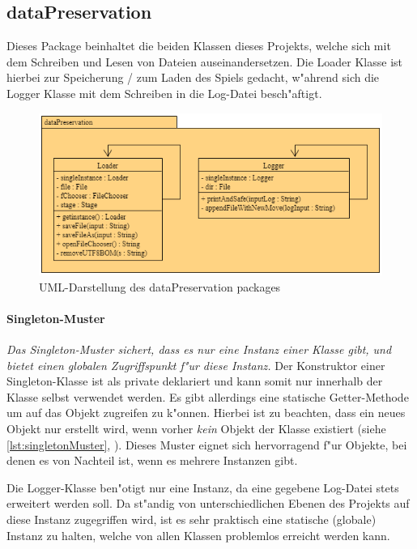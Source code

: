 \subsection{dataPreservation}
\label{ss:dataPreservation}
Dieses Package beinhaltet die beiden Klassen dieses Projekts, welche sich mit dem Schreiben und Lesen von Dateien auseinandersetzen. Die Loader Klasse ist hierbei zur Speicherung / zum Laden des Spiels gedacht, w"ahrend sich die Logger Klasse mit dem Schreiben in die Log-Datei besch"aftigt. 

\begin{figure}
	\centering
	\includegraphics{pics/dataPreservationPackage}
	\caption{UML-Darstellung des dataPreservation packages}
	\label{fig:dataPreservationPackage}
\end{figure}

\paragraph{Singleton-Muster}
\label{par:singletonMuster}
\emph{Das Singleton-Muster sichert, dass es nur eine Instanz einer Klasse gibt, und bietet einen globalen Zugriffspunkt f"ur diese Instanz.} \cite{Freeman2006}
Der Konstruktor einer Singleton-Klasse ist als private deklariert und kann somit nur innerhalb der Klasse selbst verwendet werden. Es gibt allerdings eine statische Getter-Methode um auf das Objekt zugreifen zu k"onnen. Hierbei ist zu beachten, dass ein neues Objekt nur erstellt wird, wenn vorher \emph{kein} Objekt der Klasse existiert (siehe \ref{lst:singletonMuster}, ). Dieses Muster eignet sich hervorragend f"ur Objekte, bei denen es von Nachteil ist, wenn es mehrere Instanzen gibt. 

Die Logger-Klasse ben"otigt nur eine Instanz, da eine gegebene Log-Datei stets erweitert werden soll. Da st"andig von unterschiedlichen Ebenen des Projekts auf diese Instanz zugegriffen wird, ist es sehr praktisch eine statische (globale) Instanz zu halten, welche von allen Klassen problemlos erreicht werden kann. 

